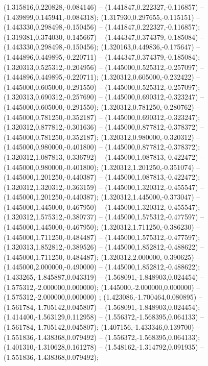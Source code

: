  (1.315816,0.220828,-0.084146) -- (1.441847,0.222327,-0.116857) -- (1.439899,0.145941,-0.084318);
 (1.317930,0.297655,-0.115151) -- (1.443330,0.298498,-0.150456) -- (1.441847,0.222327,-0.116857);
 (1.319381,0.374030,-0.145667) -- (1.444347,0.374379,-0.185084) -- (1.443330,0.298498,-0.150456);
 (1.320163,0.449836,-0.175647) -- (1.444896,0.449895,-0.220711) -- (1.444347,0.374379,-0.185084);
 (1.320313,0.525312,-0.204956) -- (1.445000,0.525312,-0.257097) -- (1.444896,0.449895,-0.220711);
 (1.320312,0.605000,-0.232422) -- (1.445000,0.605000,-0.291550) -- (1.445000,0.525312,-0.257097);
 (1.320313,0.690312,-0.257690) -- (1.445000,0.690312,-0.323247) -- (1.445000,0.605000,-0.291550);
 (1.320312,0.781250,-0.280762) -- (1.445000,0.781250,-0.352187) -- (1.445000,0.690312,-0.323247);
 (1.320312,0.877812,-0.301636) -- (1.445000,0.877812,-0.378372) -- (1.445000,0.781250,-0.352187);
 (1.320312,0.980000,-0.320312) -- (1.445000,0.980000,-0.401800) -- (1.445000,0.877812,-0.378372);
 (1.320312,1.087813,-0.336792) -- (1.445000,1.087813,-0.422472) -- (1.445000,0.980000,-0.401800);
 (1.320312,1.201250,-0.351074) -- (1.445000,1.201250,-0.440387) -- (1.445000,1.087813,-0.422472);
 (1.320312,1.320312,-0.363159) -- (1.445000,1.320312,-0.455547) -- (1.445000,1.201250,-0.440387);
 (1.320312,1.445000,-0.373047) -- (1.445000,1.445000,-0.467950) -- (1.445000,1.320312,-0.455547);
 (1.320312,1.575312,-0.380737) -- (1.445000,1.575312,-0.477597) -- (1.445000,1.445000,-0.467950);
 (1.320312,1.711250,-0.386230) -- (1.445000,1.711250,-0.484487) -- (1.445000,1.575312,-0.477597);
 (1.320313,1.852812,-0.389526) -- (1.445000,1.852812,-0.488622) -- (1.445000,1.711250,-0.484487);
 (1.320312,2.000000,-0.390625) -- (1.445000,2.000000,-0.490000) -- (1.445000,1.852812,-0.488622);
 (1.433265,-1.845887,0.043319) -- (1.568091,-1.848903,0.024454) -- (1.575312,-2.000000,0.000000);
 (1.445000,-2.000000,0.000000) -- (1.575312,-2.000000,0.000000) ;
 (1.423086,-1.700464,0.080895) -- (1.561784,-1.705142,0.045807) -- (1.568091,-1.848903,0.024454);
 (1.414400,-1.563129,0.112958) -- (1.556372,-1.568395,0.064133) -- (1.561784,-1.705142,0.045807);
 (1.407156,-1.433346,0.139700) -- (1.551836,-1.438368,0.079492) -- (1.556372,-1.568395,0.064133);
 (1.401310,-1.310628,0.161278) -- (1.548162,-1.314792,0.091935) -- (1.551836,-1.438368,0.079492);

